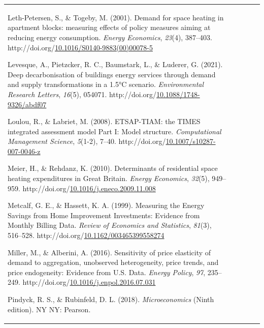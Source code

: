 \documentclass[12pt,twoside]{reedthesis}
\newlength{\cslhangindent}
\newenvironment{CSLReferences}[2] %
 {%
  \setlength{\parindent}{0pt}
  \ifodd #1 \everypar{\setlength{\hangindent}{\cslhangindent}}\ignorespaces\fi
  \ifnum #2 > 0
  \setlength{\parskip}{#2\baselineskip}
  \fi
 }%
 {}
\begin{document}
\begin{tabular}{@{}lllll@{}}
\begin{CSLReferences}{1}{0}
\leavevmode\vadjust pre{\hypertarget{ref-leth-petersen_togeby01}{}}%
Leth-Petersen, S., \& Togeby, M. (2001). Demand for space heating in apartment blocks: measuring effects of policy measures aiming at reducing energy consumption. \emph{Energy Economics}, \emph{23}(4), 387--403. http://doi.org/\href{https://doi.org/10.1016/S0140-9883(00)00078-5}{10.1016/S0140-9883(00)00078-5}

\leavevmode\vadjust pre{\hypertarget{ref-levesque_etal21}{}}%
Levesque, A., Pietzcker, R. C., Baumstark, L., \& Luderer, G. (2021). Deep decarbonisation of buildings energy services through demand and supply transformations in a 1.5°C scenario. \emph{Environmental Research Letters}, \emph{16}(5), 054071. http://doi.org/\href{https://doi.org/10.1088/1748-9326/abdf07}{10.1088/1748-9326/abdf07}

\leavevmode\vadjust pre{\hypertarget{ref-loulou_labriet08}{}}%
Loulou, R., \& Labriet, M. (2008). ETSAP-TIAM: the TIMES integrated assessment model Part I: Model structure. \emph{Computational Management Science}, \emph{5}(1-2), 7--40. http://doi.org/\href{https://doi.org/10.1007/s10287-007-0046-z}{10.1007/s10287-007-0046-z}

\leavevmode\vadjust pre{\hypertarget{ref-meier_rehdanz10}{}}%
Meier, H., \& Rehdanz, K. (2010). Determinants of residential space heating expenditures in Great Britain. \emph{Energy Economics}, \emph{32}(5), 949--959. http://doi.org/\href{https://doi.org/10.1016/j.eneco.2009.11.008}{10.1016/j.eneco.2009.11.008}

\leavevmode\vadjust pre{\hypertarget{ref-metcalf_hassett99}{}}%
Metcalf, G. E., \& Hassett, K. A. (1999). Measuring the Energy Savings from Home Improvement Investments: Evidence from Monthly Billing Data. \emph{Review of Economics and Statistics}, \emph{81}(3), 516--528. http://doi.org/\href{https://doi.org/10.1162/003465399558274}{10.1162/003465399558274}

\leavevmode\vadjust pre{\hypertarget{ref-miller_alberini16}{}}%
Miller, M., \& Alberini, A. (2016). Sensitivity of price elasticity of demand to aggregation, unobserved heterogeneity, price trends, and price endogeneity: Evidence from U.S. Data. \emph{Energy Policy}, \emph{97}, 235--249. http://doi.org/\href{https://doi.org/10.1016/j.enpol.2016.07.031}{10.1016/j.enpol.2016.07.031}

\leavevmode\vadjust pre{\hypertarget{ref-pindyck_rubinfeld18}{}}%
Pindyck, R. S., \& Rubinfeld, D. L. (2018). \emph{Microeconomics} (Ninth edition). NY NY: Pearson.


\end{CSLReferences}
\end{tabular}
\end{document}
